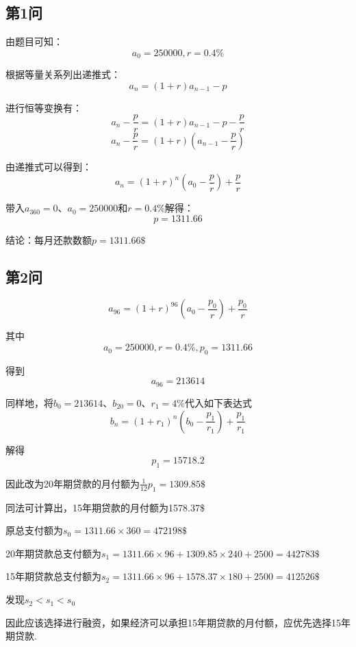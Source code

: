\documentclass{article}
\begin{document}
\subsection{第1问}
由题目可知：
\[a_0 = 250000, r = 0.4\%\]

根据等量关系列出递推式：
\[a_n = (1+r)a_{n-1} - p\]

进行恒等变换有：
\[a_n - \frac{p}{r} = (1+r)a_{n-1} - p - \frac{p}{r}\]
\[a_n - \frac{p}{r} = (1+r)(a_{n-1} - \frac{p}{r})\]

由递推式可以得到：
\[a_n = (1+r)^n(a_0 - \frac{p}{r}) + \frac{p}{r}\]

带入$a_{360} = 0$、$a_0 = 250000$和$r=0.4\%$解得：
\[p=1311.66\]

结论：每月还款数额$p=1311.66\$$


\subsection{第2问}
\[a_{96} = (1+r)^{96}(a_0-\frac{p_0}{r}) + \frac{p_0}{r}\]

其中
\[a_0 = 250000, r = 0.4\%, p_0 = 1311.66\]

得到
\[a_{96} = 213614\]

同样地，将$b_0=213614$、$b_{20}=0$、$r_1=4\%$代入如下表达式
\[b_n=(1+r_1)^n(b_0-\frac{p_1}{r_1})+\frac{p_1}{r_1}\]

解得
\[p_1=15718.2\]

因此改为20年期贷款的月付额为$\frac{1}{12}p_1=1309.85\$$

同法可计算出，15年期贷款的月付额为1578.37\$

原总支付额为$s_0 = 1311.66 \times 360 = 472198\$$

20年期贷款总支付额为$s_1 = 1311.66 \times 96 + 1309.85 \times 240 + 2500 = 442783\$$

15年期贷款总支付额为$s_2 = 1311.66 \times 96 + 1578.37 \times 180 + 2500 = 412526\$$

发现$s_2 < s_1 < s_0$

因此应该选择进行融资，如果经济可以承担15年期贷款的月付额，应优先选择15年期贷款.
\end{document}

